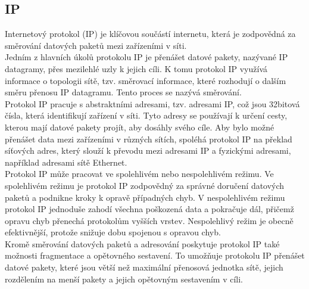 \documentclass[12pt]{report}			%
\begin{document}
				\subsection{IP}
Internetový protokol (IP) je klíčovou součástí internetu, která je zodpovědná za směrování datových paketů mezi zařízeními v síti.
\\
Jedním z hlavních úkolů protokolu IP je přenášet datové pakety, nazývané IP datagramy, přes mezilehlé uzly k jejich cíli. K tomu protokol IP využívá informace o topologii sítě, tzv. směrovací informace, které rozhodují o dalším směru přenosu IP datagramu. Tento proces se nazývá směrování.
\\
Protokol IP pracuje s abstraktními adresami, tzv. adresami IP, což jsou 32bitová čísla, která identifikují zařízení v síti. Tyto adresy se používají k určení cesty, kterou mají datové pakety projít, aby dosáhly svého cíle. Aby bylo možné přenášet data mezi zařízeními v různých sítích, spoléhá protokol IP na překlad síťových adres, který slouží k převodu mezi adresami IP a fyzickými adresami, například adresami sítě Ethernet.
\\
Protokol IP může pracovat ve spolehlivém nebo nespolehlivém režimu. Ve spolehlivém režimu je protokol IP zodpovědný za správné doručení datových paketů a podnikne kroky k opravě případných chyb. V nespolehlivém režimu protokol IP jednoduše zahodí všechna poškozená data a pokračuje dál, přičemž opravu chyb přenechá protokolům vyšších vrstev. Nespolehlivý režim je obecně efektivnější, protože snižuje dobu spojenou s opravou chyb.
\\
Kromě směrování datových paketů a adresování poskytuje protokol IP také možnosti fragmentace a opětovného sestavení. To umožňuje protokolu IP přenášet datové pakety, které jsou větší než maximální přenosová jednotka sítě, jejich rozdělením na menší pakety a jejich opětovným sestavením v cíli.\cite{IP1}\cite{IP2}\cite{IP3}\cite{IP4}
\end{document}
